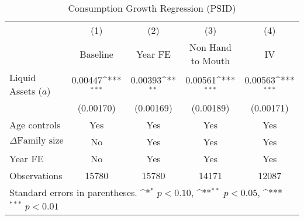 {
\def\sym#1{\ifmmode^{#1}\else\(^{#1}\)\fi}
\begin{longtable}{l*{4}{c}}
\caption{Consumption Growth Regression (PSID)} \label{table:EE-PSID-Baseline} \\
\toprule\endfirsthead\midrule\endhead\midrule\endfoot\endlastfoot
                    &\multicolumn{1}{c}{(1)}&\multicolumn{1}{c}{(2)}&\multicolumn{1}{c}{(3)}&\multicolumn{1}{c}{(4)}\\
                    &\multicolumn{1}{c}{Baseline}&\multicolumn{1}{c}{Year FE}&\multicolumn{1}{c}{Non Hand to Mouth}&\multicolumn{1}{c}{IV}\\
\midrule
Liquid Assets ($ a $) $\;\;\;\;\;\;\;\;\;\;\;\;$&     0.00447\sym{***}&     0.00393\sym{**} &     0.00561\sym{***}&     0.00563\sym{***}\\
                    &   (0.00170)         &   (0.00169)         &   (0.00189)         &   (0.00171)         \\
\addlinespace
Age controls        &         Yes         &         Yes         &         Yes         &         Yes         \\
\addlinespace
$\Delta\text{Family size}$ &          No         &         Yes         &         Yes         &         Yes         \\
\addlinespace
Year FE             &          No         &         Yes         &         Yes         &         Yes         \\
\midrule
Observations        &       15780         &       15780         &       14171         &       12087         \\
\bottomrule
\multicolumn{5}{l}{\footnotesize Standard errors in parentheses. \sym{*} \(p<0.10\), \sym{**} \(p<0.05\), \sym{***} \(p<0.01\) }\\
\end{longtable}
}
